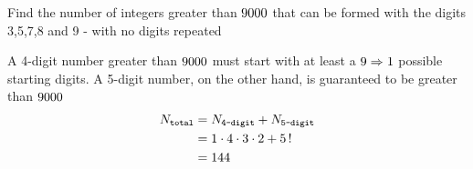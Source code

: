 \question Find the number of integers greater than $9000$ that can be formed with the digits 3,5,7,8 and 9 - with
 no digits repeated

\insertQR[-20pt]{}

\watchout

\ifprintanswers
\fi 

\begin{solution}
	A 4-digit number greater than $9000$ must start with at least a $9 \Rightarrow 1$ possible starting digits.
	A 5-digit number, on the other hand, is guaranteed to be greater than $9000$
	\begin{align}
		N_{\texttt{total}} &= N_{\texttt{4-digit}} + N_{\texttt{5-digit}} \\
		   &= 1\cdot 4\cdot 3 \cdot 2 + 5\,! \\
		   &= 144
	\end{align}
\end{solution}

